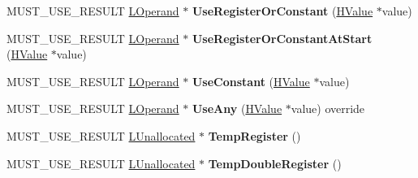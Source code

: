 \begin{DoxyCompactItemize}
\item 
M\+U\+S\+T\+\_\+\+U\+S\+E\+\_\+\+R\+E\+S\+U\+LT \hyperlink{classv8_1_1internal_1_1_l_operand}{L\+Operand} $\ast$ {\bfseries Use\+Register\+Or\+Constant} (\hyperlink{classv8_1_1internal_1_1_h_value}{H\+Value} $\ast$value)\hypertarget{classv8_1_1internal_1_1_l_chunk_builder_aace121601a2caa8e6684cc5d5963f0df}{}\label{classv8_1_1internal_1_1_l_chunk_builder_aace121601a2caa8e6684cc5d5963f0df}

\item 
M\+U\+S\+T\+\_\+\+U\+S\+E\+\_\+\+R\+E\+S\+U\+LT \hyperlink{classv8_1_1internal_1_1_l_operand}{L\+Operand} $\ast$ {\bfseries Use\+Register\+Or\+Constant\+At\+Start} (\hyperlink{classv8_1_1internal_1_1_h_value}{H\+Value} $\ast$value)\hypertarget{classv8_1_1internal_1_1_l_chunk_builder_a14ca10ac408e3ec8501d2875ddf606fc}{}\label{classv8_1_1internal_1_1_l_chunk_builder_a14ca10ac408e3ec8501d2875ddf606fc}

\item 
M\+U\+S\+T\+\_\+\+U\+S\+E\+\_\+\+R\+E\+S\+U\+LT \hyperlink{classv8_1_1internal_1_1_l_operand}{L\+Operand} $\ast$ {\bfseries Use\+Constant} (\hyperlink{classv8_1_1internal_1_1_h_value}{H\+Value} $\ast$value)\hypertarget{classv8_1_1internal_1_1_l_chunk_builder_a6985436610071c802b9a670ae3f60700}{}\label{classv8_1_1internal_1_1_l_chunk_builder_a6985436610071c802b9a670ae3f60700}

\item 
M\+U\+S\+T\+\_\+\+U\+S\+E\+\_\+\+R\+E\+S\+U\+LT \hyperlink{classv8_1_1internal_1_1_l_operand}{L\+Operand} $\ast$ {\bfseries Use\+Any} (\hyperlink{classv8_1_1internal_1_1_h_value}{H\+Value} $\ast$value) override\hypertarget{classv8_1_1internal_1_1_l_chunk_builder_a61cb5c69ba1d82ff575d5d84ff6d1721}{}\label{classv8_1_1internal_1_1_l_chunk_builder_a61cb5c69ba1d82ff575d5d84ff6d1721}

\item 
M\+U\+S\+T\+\_\+\+U\+S\+E\+\_\+\+R\+E\+S\+U\+LT \hyperlink{classv8_1_1internal_1_1_l_unallocated}{L\+Unallocated} $\ast$ {\bfseries Temp\+Register} ()\hypertarget{classv8_1_1internal_1_1_l_chunk_builder_a4ba4ae71849e93fc59cb527dce3dbeea}{}\label{classv8_1_1internal_1_1_l_chunk_builder_a4ba4ae71849e93fc59cb527dce3dbeea}

\item 
M\+U\+S\+T\+\_\+\+U\+S\+E\+\_\+\+R\+E\+S\+U\+LT \hyperlink{classv8_1_1internal_1_1_l_unallocated}{L\+Unallocated} $\ast$ {\bfseries Temp\+Double\+Register} ()\hypertarget{classv8_1_1internal_1_1_l_chunk_builder_a524f9d3d8fb435bb5c2232a108423493}{}\label{classv8_1_1internal_1_1_l_chunk_builder_a524f9d3d8fb435bb5c2232a108423493}


\end{DoxyCompactItemize}
